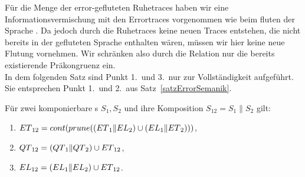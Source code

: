 Für die Menge der error-gefluteten Ruhetraces \QT{} haben wir eine Informationsvermischung
mit den Errortraces vorgenommen wie beim fluten der Sprache \EL{}. Da jedoch
durch die Ruhetraces keine neuen Traces entstehen, die nicht bereits in der
gefluteten Sprache \EL{} enthalten wären, müssen wir hier keine neue Flutung
vornehmen. Wir schränken also durch die Relation \QRel{} nur die
bereits existierende Präkongruenz \ERel{} ein.\\
In dem folgenden Satz sind Punkt 1.\ und 3.\ nur zur Vollständigkeit aufgeführt.
Sie entsprechen Punkt 1.\ und 2.\ aus Satz~\ref{satzErrorSemanik}.

\begin{satz}
  \label{satzQuiSemantik}
  Für zwei komponierbare \EIO{}s $S_1, S_2$ und ihre Komposition $S_{12} =
  S_1\|S_2$ gilt:
  \begin{enumerate}
    \item $ET{}_{12} = cont{}(prune{}((ET{}_1\|EL{}_2)\cup (EL{}_1\|ET{}_2)))$,
    \item $QT{}_{12} = (QT{}_1\|QT{}_2)\cup ET{}_{12}$,
    \item $EL{}_{12} = (EL{}_1\|EL{}_2)\cup ET{}_{12}$.
  \end{enumerate}
\end{satz}

